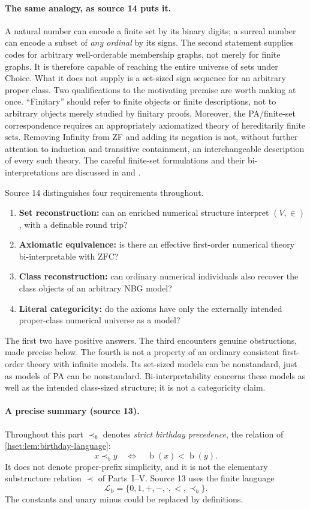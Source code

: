 \documentclass[11pt,letterpaper]{article}
\theoremstyle{definition}
\theoremstyle{remark}
\newcommand{\bd}{\operatorname{b}}
\newcommand{\ZFC}{\mathrm{ZFC}}
\newcommand{\precb}{\prec_b}
\newcommand{\Lb}{\mathcal L_{\mathrm b}}
\begin{document}
\paragraph{The same analogy, as source 14 puts it.} A natural number can encode
a finite set by its binary digits; a surreal number can encode a subset of
\emph{any ordinal} by its signs. The second statement supplies codes for
arbitrary well-orderable membership graphs, not merely for finite graphs. It is
therefore capable of reaching the entire universe of sets under Choice. What it
does not supply is a set-sized sign sequence for an arbitrary proper class. Two
qualifications to the motivating premise are worth making at once.
``Finitary'' should refer to finite objects or finite descriptions, not to
arbitrary objects merely studied by finitary proofs. Moreover, the PA/finite-set
correspondence requires an appropriately axiomatized theory of hereditarily
finite sets. Removing Infinity from ZF and adding its negation is not, without
further attention to induction and transitive containment, an interchangeable
description of every such theory. The careful finite-set formulations and their
bi-interpretations are discussed in \cite{KayeWong} and \cite[\S6.3]{FriedmanVisser}.

Source 14 distinguishes four requirements throughout.
\begin{enumerate}[label=(\roman*)]
\item \textbf{Set reconstruction:} can an enriched numerical structure interpret
$(V,\in)$, with a definable round trip?
\item \textbf{Axiomatic equivalence:} is there an effective first-order numerical
theory bi-interpretable with $\ZFC$?
\item \textbf{Class reconstruction:} can ordinary numerical individuals also
recover the class objects of an arbitrary NBG model?
\item \textbf{Literal categoricity:} do the axioms have only the externally
intended proper-class numerical universe as a model?
\end{enumerate}
The first two have positive answers. The third encounters genuine obstructions,
made precise below. The fourth is not a property of an ordinary consistent
first-order theory with infinite models. Its set-sized models can be
nonstandard, just as models of PA can be nonstandard. Bi-interpretability
concerns these models as well as the intended class-sized structure; it is not a
categoricity claim.

\paragraph{A precise summary (source 13).} Throughout this part $\precb$ denotes
\emph{strict birthday precedence}, the relation of \cref{hset:lem:birthday-language}:
\[
 x\precb y\quad\Longleftrightarrow\quad \bd(x)<\bd(y).
\]
It does not denote proper-prefix simplicity, and it is not the elementary
substructure relation $\prec$ of Parts~I--V. Source 13 uses the finite language
\[
 \Lb=\{0,1,+,-,\cdot,<,\precb\}.
\]
The constants and unary minus could be replaced by definitions.
\end{document}
